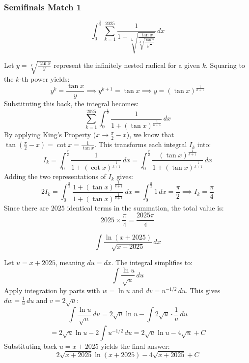 \subsubsection*{Semifinals Match 1}
\begin{questions}
    \question
    \[ \int_{0}^{\frac{\pi}{2}} \sum_{k=1}^{2025} \frac{1}{1 + \sqrt[k]{\frac{\tan x}{\sqrt[k]{\frac{\tan x}{\sqrt[k]{\dots}}}}}} \, dx \]
    \begin{solution}
        Let $y = \sqrt[k]{\frac{\tan x}{y}}$ represent the infinitely nested radical for a given $k$. Squaring to the $k$-th power yields:
        \[ y^k = \frac{\tan x}{y} \implies y^{k+1} = \tan x \implies y = (\tan x)^{\frac{1}{k+1}} \]
        Substituting this back, the integral becomes:
        \[ \sum_{k=1}^{2025} \int_{0}^{\frac{\pi}{2}} \frac{1}{1 + (\tan x)^{\frac{1}{k+1}}} \, dx \]
        By applying King's Property ($x \to \frac{\pi}{2} - x$), we know that $\tan\left(\frac{\pi}{2}-x\right) = \cot x = \frac{1}{\tan x}$. This transforms each integral $I_k$ into:
        \[ I_k = \int_{0}^{\frac{\pi}{2}} \frac{1}{1 + (\cot x)^{\frac{1}{k+1}}} \, dx = \int_{0}^{\frac{\pi}{2}} \frac{(\tan x)^{\frac{1}{k+1}}}{1 + (\tan x)^{\frac{1}{k+1}}} \, dx \]
        Adding the two representations of $I_k$ gives:
        \[ 2I_k = \int_{0}^{\frac{\pi}{2}} \frac{1 + (\tan x)^{\frac{1}{k+1}}}{1 + (\tan x)^{\frac{1}{k+1}}} \, dx = \int_{0}^{\frac{\pi}{2}} 1 \, dx = \frac{\pi}{2} \implies I_k = \frac{\pi}{4} \]
        Since there are $2025$ identical terms in the summation, the total value is:
        \[ 2025 \times \frac{\pi}{4} = \frac{2025\pi}{4} \]
    \end{solution}

    \question
    \[ \int \frac{\ln(x + 2025)}{\sqrt{x + 2025}} \, dx \]
    \begin{solution}
        Let $u = x + 2025$, meaning $du = dx$. The integral simplifies to:
        \[ \int \frac{\ln u}{\sqrt{u}} \, du \]
        Apply integration by parts with $w = \ln u$ and $dv = u^{-1/2} \, du$. This gives $dw = \frac{1}{u} \, du$ and $v = 2\sqrt{u}$:
        \[ \int \frac{\ln u}{\sqrt{u}} \, du = 2\sqrt{u}\ln u - \int 2\sqrt{u} \cdot \frac{1}{u} \, du \]
        \[ = 2\sqrt{u}\ln u - 2\int u^{-1/2} \, du = 2\sqrt{u}\ln u - 4\sqrt{u} + C \]
        Substituting back $u = x + 2025$ yields the final answer:
        \[ 2\sqrt{x + 2025}\ln(x + 2025) - 4\sqrt{x + 2025} + C \]
    \end{solution}


\end{questions}
